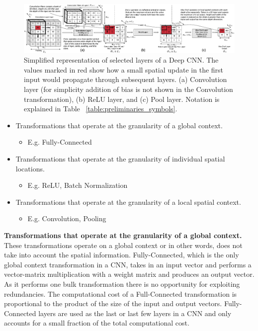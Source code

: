 \begin{figure}[t]
\includegraphics[width=\textwidth]{images/cnn_simplified}
\caption{Simplified representation of selected layers of a Deep CNN. The values marked in red show how a small spatial update in the first input would propagate through subsequent layers. (a) Convolution layer (for simplicity addition of bias is not shown in the Convolution transformation), (b) ReLU layer, and (c) Pool layer. Notation is explained in Table ~\ref{table:preliminaries_symbols}.}
\label{fig:cnn_simplified}
\end{figure}

\begin{itemize}
    \item Transformations that operate at the granularity of a global context.
    \begin{itemize}
     \item E.g. Fully-Connected
    \end{itemize}
	\item Transformations that operate at the granularity of individual  spatial locations.
	\begin{itemize}
	 \item E.g. ReLU, Batch Normalization
	\end{itemize}
	\item Transformations that operate at the granularity of a local spatial context.
	\begin{itemize}
	 \item E.g. Convolution, Pooling
	\end{itemize}
\end{itemize}

\vspace{2mm}
\noindent \textbf{Transformations that operate at the granularity of a global context.} These transformations operate on a global context or in other words, does not take into account the spatial information.
Fully-Connected, which is the only global context transformation in a CNN, takes in an input vector and performs a vector-matrix multiplication with a weight matrix and produces an output vector.
As it performs one bulk transformation there is no opportunity for exploiting redundancies.
The computational cost of a Full-Connected transformation is proportional to the product of the size of the input and output vectors.
Fully-Connected layers are used as the last or last few layers in a CNN and only accounts for a small fraction of the total computational cost.

